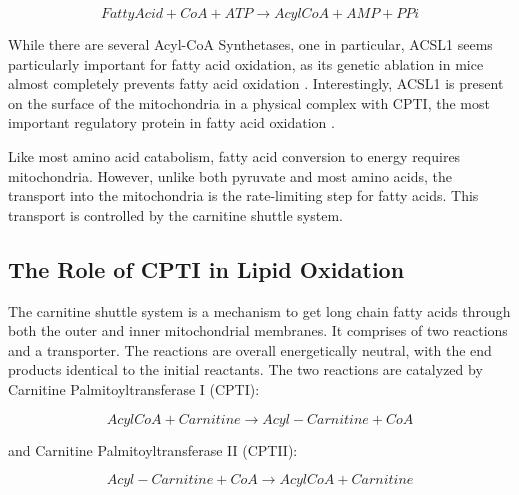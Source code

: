\documentclass{tufte-handout}
\begin{document}
\begin{equation}\label{eq:acs}
Fatty Acid + CoA +  ATP \rightarrow AcylCoA + AMP + PPi
\end{equation} 

While there are several Acyl-CoA Synthetases, one in particular, ACSL1 seems particularly important for fatty acid oxidation, as its genetic ablation in mice almost completely prevents fatty acid oxidation \citep{Ellis2011a}.  Interestingly, ACSL1 is present on the surface of the mitochondria in a physical complex with CPTI, the most important regulatory protein in fatty acid oxidation \citep{Lee2011l}.

  Like most amino acid catabolism, fatty acid conversion to energy requires mitochondria.  However, unlike both pyruvate and most amino acids, the transport into the mitochondria is the rate-limiting step for fatty acids.  This transport is controlled by the carnitine shuttle system.

\subsection{The Role of CPTI in Lipid Oxidation}

The carnitine shuttle system is a mechanism to get long chain fatty acids through both the outer and inner mitochondrial membranes.  It comprises of two reactions and a transporter.  The reactions are overall energetically neutral, with the end products identical to the initial reactants.  The two reactions are catalyzed by Carnitine Palmitoyltransferase I (CPTI):

\begin{equation}
AcylCoA + Carnitine \rightarrow Acyl-Carnitine + CoA
\end{equation} 

and Carnitine Palmitoyltransferase II (CPTII):

\begin{equation}
Acyl-Carnitine + CoA \rightarrow AcylCoA + Carnitine
\end{equation} 
\end{document}
